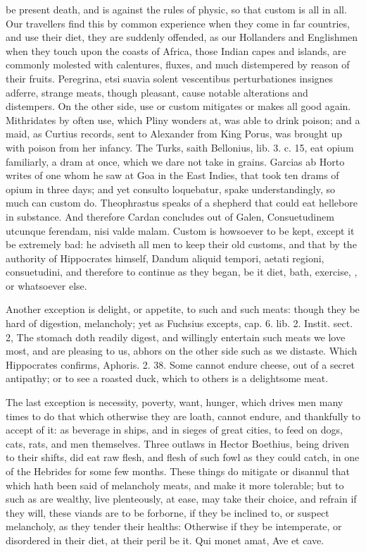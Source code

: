 {{be present death, and is against the rules of physic, so that custom is
all in all. Our travellers find this by common experience when they
come in far countries, and use their diet, they are suddenly offended,
as our Hollanders and Englishmen when they touch upon the coasts
of Africa, those Indian capes and islands, are commonly molested with
calentures, fluxes, and much distempered by reason of their fruits.
Peregrina, etsi suavia solent vescentibus perturbationes insignes
adferre, strange meats, though pleasant, cause notable alterations and
distempers. On the other side, use or custom mitigates or makes all
good again. Mithridates by often use, which Pliny wonders at, was able
to drink poison; and a maid, as Curtius records, sent to Alexander from
King Porus, was brought up with poison from her infancy. The Turks,
saith Bellonius, lib. 3. c. 15, eat opium familiarly, a dram at once,
which we dare not take in grains. Garcias ab Horto writes of one
whom he saw at Goa in the East Indies, that took ten drams of opium in
three days; and yet consulto loquebatur, spake understandingly, so much
can custom do.  Theophrastus speaks of a shepherd that could eat
hellebore in substance. And therefore Cardan concludes out of Galen,
Consuetudinem utcunque ferendam, nisi valde malam. Custom is howsoever
to be kept, except it be extremely bad: he adviseth all men to keep
their old customs, and that by the authority of Hippocrates
himself, Dandum aliquid tempori, aetati regioni, consuetudini, and
therefore to continue as they began, be it diet, bath, exercise,
\etc{}, or whatsoever else.

Another exception is delight, or appetite, to such and such meats:
though they be hard of digestion, melancholy; yet as Fuchsius excepts,
cap. 6. lib. 2. Instit. sect. 2, The stomach doth readily digest,
and willingly entertain such meats we love most, and are pleasing to
us, abhors on the other side such as we distaste. Which Hippocrates
confirms, Aphoris. 2. 38. Some cannot endure cheese, out of a secret
antipathy; or to see a roasted duck, which to others is a
delightsome meat.

The last exception is necessity, poverty, want, hunger, which drives
men many times to do that which otherwise they are loath, cannot
endure, and thankfully to accept of it: as beverage in ships, and in
sieges of great cities, to feed on dogs, cats, rats, and men
themselves. Three outlaws in Hector Boethius, being driven to
their shifts, did eat raw flesh, and flesh of such fowl as they could
catch, in one of the Hebrides for some few months. These things do
mitigate or disannul that which hath been said of melancholy meats, and
make it more tolerable; but to such as are wealthy, live plenteously,
at ease, may take their choice, and refrain if they will, these viands
are to be forborne, if they be inclined to, or suspect melancholy, as
they tender their healths: Otherwise if they be intemperate, or
disordered in their diet, at their peril be it. Qui monet amat, Ave et
cave.

}}
